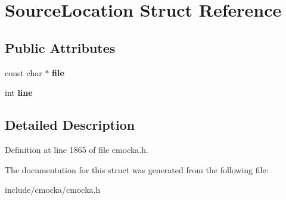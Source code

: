 \hypertarget{structSourceLocation}{}\section{Source\+Location Struct Reference}
\label{structSourceLocation}
\subsection*{Public Attributes}
\begin{DoxyCompactItemize}
\item 
\mbox{\label{structSourceLocation_abe1a3fee04b49b1ea16c433d345d9e3d}} 
const char $\ast$ {\bfseries file}
\item 
\mbox{\label{structSourceLocation_a0841da7b3abbe7aca24bb57f071e1042}} 
int {\bfseries line}
\end{DoxyCompactItemize}


\subsection{Detailed Description}


Definition at line 1865 of file cmocka.\+h.



The documentation for this struct was generated from the following file\+:\begin{DoxyCompactItemize}
\item 
include/cmocka/cmocka.\+h\end{DoxyCompactItemize}
